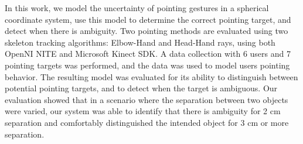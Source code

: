 In this work, we model the uncertainty of pointing gestures in a spherical coordinate system, use this model to determine the correct pointing target, and detect when there is ambiguity. Two pointing methods are evaluated using two skeleton tracking algorithms: Elbow-Hand and Head-Hand rays, using both OpenNI NITE and Microsoft Kinect SDK.  A data collection with 6 users and 7 pointing targets was performed, and the data was used to model users pointing behavior.  The resulting model was evaluated for its ability to distinguish between potential pointing targets, and to detect when the target is ambiguous. Our evaluation showed that in a scenario where the separation between two objects were varied, our system was able to identify that there is ambiguity for 2 cm separation and comfortably distinguished the intended object for 3 cm or more separation.
